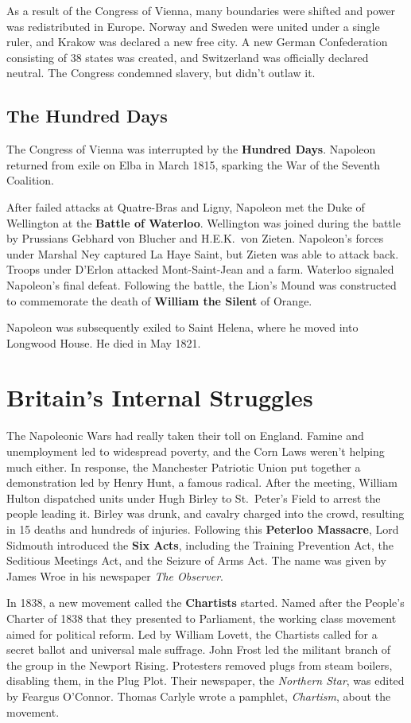 As a result of the Congress of Vienna, many boundaries were shifted and power was redistributed in Europe.
Norway and Sweden were united under a single ruler, and Krakow was declared a new free city.
A new German Confederation consisting of 38 states was created, and Switzerland was officially declared neutral.
The Congress condemned slavery, but didn't outlaw it.

\subsection*{The Hundred Days}

The Congress of Vienna was interrupted by the \textbf{Hundred Days}.
Napoleon returned from exile on Elba in March 1815,
sparking the War of the Seventh Coalition.

After failed attacks at Quatre-Bras and Ligny,
Napoleon met the Duke of Wellington at the \textbf{Battle of Waterloo}.
Wellington was joined during the battle by Prussians Gebhard von Blucher and H.E.K.\ von Zieten.
Napoleon's forces under Marshal Ney captured La Haye Saint, but Zieten was able to attack back.
Troops under D'Erlon attacked Mont-Saint-Jean and a farm.
Waterloo signaled Napoleon's final defeat.
Following the battle,
the Lion's Mound was constructed to commemorate the death of \textbf{William the Silent} of Orange.

Napoleon was subsequently exiled to Saint Helena, where he moved into Longwood House.
He died in May 1821.

\section{Britain's Internal Struggles}

The Napoleonic Wars had really taken their toll on England.
Famine and unemployment led to widespread poverty, and the Corn Laws weren't helping much either.
In response, the Manchester Patriotic Union put together a demonstration led by Henry Hunt, a famous radical.
After the meeting,
William Hulton dispatched units under Hugh Birley to St.\ Peter's Field to arrest the people leading it.
Birley was drunk, and cavalry charged into the crowd, resulting in 15 deaths and hundreds of injuries.
Following this \textbf{Peterloo Massacre},
Lord Sidmouth introduced the \textbf{Six Acts}, including
the Training Prevention Act,
the Seditious Meetings Act,
and the Seizure of Arms Act.
The name was given by James Wroe in his newspaper \textit{The Observer}.

In 1838, a new movement called the \textbf{Chartists} started.
Named after the People's Charter of 1838 that they presented to Parliament,
the working class movement aimed for political reform.
Led by William Lovett, the Chartists called for a secret ballot and universal male suffrage.
John Frost led the militant branch of the group in the Newport Rising.
Protesters removed plugs from steam boilers, disabling them, in the Plug Plot.
Their newspaper, the \textit{Northern Star}, was edited by Feargus O'Connor.
Thomas Carlyle wrote a pamphlet, \textit{Chartism}, about the movement.
